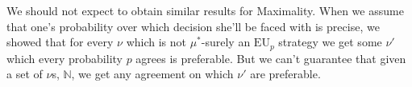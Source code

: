 \documentclass[a4paper]{article}
\newcommand\EU{\mathrm{EU}}
\newcommand{\IB}{\mathbb{B}}
\newenvironment{CCM rewritten}
{\begingroup\color{blue}} %
{\endgroup}              %
\begin{document}
{%
%	
%
We should not expect to obtain similar results for Maximality.
When we assume that one's probability over which decision she'll be faced with is precise, we showed that for every $\nu$ which is not $\mu^*$-surely an $\EU_p$ strategy we get some $\nu'$ which every probability $p$ agrees is preferable. But we can't guarantee that given a set of $\nu$s, $\mathbb{N}$, we get any agreement on which $\nu'$ are preferable.

	}
	
\end{document}
